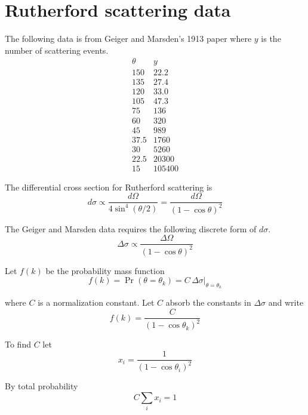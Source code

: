 

\section*{Rutherford scattering data}

The following data is from Geiger and Marsden's 1913 paper
where $y$ is the number of scattering events.
\begin{equation*}
\begin{matrix}
\theta & y\\
150 & 22.2\\
135 & 27.4\\
120 & 33.0\\
105 & 47.3\\
75 & 136\\
60 & 320\\
45 & 989\\
37.5 & 1760\\
30 & 5260\\
22.5 & 20300\\
15 & 105400
\end{matrix}
\end{equation*}

The differential cross section for Rutherford scattering is
\begin{equation*}
d\sigma\propto\frac{d\Omega}{4\sin^4(\theta/2)}
=\frac{d\Omega}{(1-\cos\theta)^2}
\end{equation*}

The Geiger and Marsden data requires the following discrete form of $d\sigma$.
\begin{equation*}
\Delta\sigma\propto\frac{\Delta\Omega}{(1-\cos\theta)^2}
\end{equation*}

Let $f(k)$ be the probability mass function
\begin{equation*}
f(k)=\Pr(\theta=\theta_k)=C\,\Delta\sigma\big|_{\theta=\theta_k}
\end{equation*}

where $C$ is a normalization constant.
Let $C$ absorb the constants in $\Delta\sigma$ and write
\begin{equation*}
f(k)=\frac{C}{(1-\cos\theta_k)^2}
\end{equation*}

To find $C$ let
\begin{equation*}
x_i=\frac{1}{(1-\cos\theta_i)^2}
\end{equation*}

By total probability
\begin{equation*}
C\sum_i x_i=1
\end{equation*}

